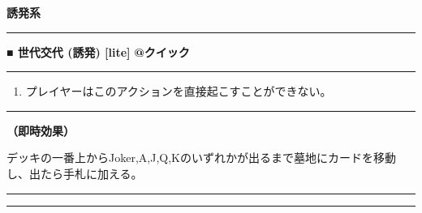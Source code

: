\documentclass[twocolumn,a5paper,papersize,10pt]{jarticle}
\begin{document}
\begin{tcolorbox}
{\scriptsize\bf 誘発系}
\end{tcolorbox}
\vspace{-1zh}%
\vspace{2mm} %
\hrule height 0.5mm depth 0mm width 66.5mm %
\vspace{1mm} %
{\small\bf ■ 世代交代 {\scriptsize (誘発) [lite]}} %
\hfill 
{\footnotesize\bf @クイック }


\vspace{1mm}%
\hrule height 0.1mm depth 0mm width 66.5mm %
\vspace{1mm}%


\vspace{-1zh}%
\begin{enumerate}
\renewcommand{\labelenumi}{※}
\setlength{\leftskip}{-0.3cm}
\setlength{\itemsep}{0pt} %
\setlength{\parskip}{0pt} %

\item プレイヤーはこのアクションを直接起こすことができない。

\vspace{-3mm}%
\end{enumerate}
\vspace{1mm}%
\hrule height 0.1mm depth 0mm width 66.5mm %
\vspace{1mm}%

{\bf（即時効果）}

デッキの一番上からJoker,A,J,Q,Kのいずれかが出るまで墓地にカードを移動し、出たら手札に加える。


\begin{center}
\begin{center}
\hrule height 1mm depth 0mm width 66.5mm %
\vspace{1mm}%
{\Large\bf {}}
\vspace{1mm}%
\hrule height 0.5mm depth 0mm width 66.5mm %
\end{center}
\end{center}
\vspace{-1zh}%
\end{document}
